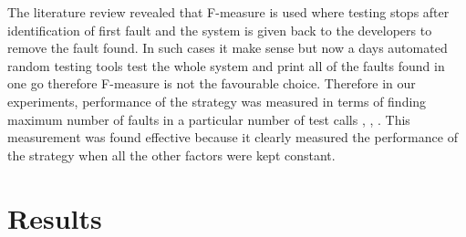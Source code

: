 \documentclass[conference]{IEEEtran}
\begin{document}

  
The literature review revealed that F-measure is used where testing stops after identification of first fault and the system is given back to the developers to remove the fault found. In such cases it make sense but now a days automated random testing tools test the whole system and print all of the faults found in one go therefore F-measure is not the favourable choice. Therefore in our experiments, performance of the strategy was measured in terms of finding maximum number of faults in a particular number of test calls \cite{Pacheco2007a}, \cite{Ciupa2007}, \cite{Ciupa2008b}. This measurement was found effective because it clearly measured the performance of the strategy when all the other factors were kept constant.



\section{Results}\label{sec:res}
\end{document}
